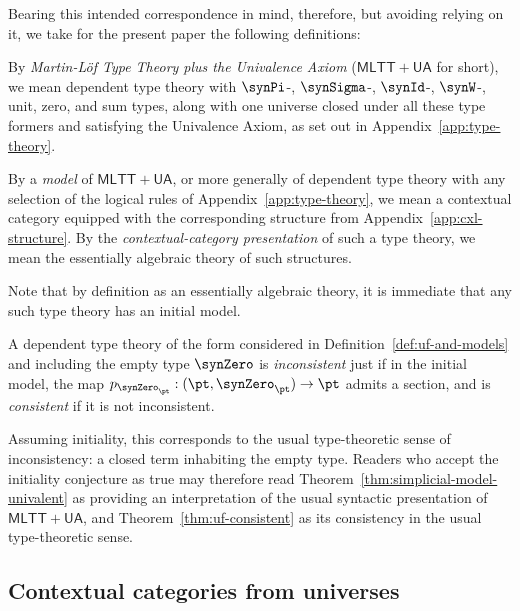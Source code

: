 Bearing this intended correspondence in mind, therefore, but avoiding relying on it, we take for the present paper the following definitions:

\begin{definition} \label{def:uf-and-models}
  By \emph{Martin-L\"of Type Theory plus the Univalence Axiom} ($\mathsf{MLTT}+\mathsf{UA}$ for short), we mean dependent type theory with $\synPi$-, $\synSigma$-, $\synId$-, $\synW$-, unit, zero, and sum types, along with one universe closed under all these type formers and satisfying the Univalence Axiom, as set out in Appendix~\ref{app:type-theory}.

  By a \emph{model} of $\mathsf{MLTT}+\mathsf{UA}$, or more generally of dependent type theory with any selection of the logical rules of Appendix~\ref{app:type-theory}, we mean a contextual category equipped with the corresponding structure from Appendix~\ref{app:cxl-structure}.  By the \emph{contextual-category presentation} of such a type theory, we mean the essentially algebraic theory of such structures.
\end{definition}

Note that by definition as an essentially algebraic theory, it is immediate that any such type theory has an initial model.

\begin{definition}
  A dependent type theory of the form considered in Definition~\ref{def:uf-and-models} and including the empty type $\synZero$ is \emph{inconsistent} just if in the initial model, the map $p_{\synZero_\pt} : (\pt,\synZero_\pt) \to \pt$ admits a section, and is \emph{consistent} if it is not inconsistent.
\end{definition}

Assuming initiality, this corresponds to the usual type-theoretic sense of inconsistency: a closed term inhabiting the empty type.
Readers who accept the initiality conjecture as true may therefore read Theorem~\ref{thm:simplicial-model-univalent} as providing an interpretation of the usual syntactic presentation of $\mathsf{MLTT}+\mathsf{UA}$, and Theorem~\ref{thm:uf-consistent} as its consistency in the usual type-theoretic sense.

\subsection{Contextual categories from universes} \label{subsec:contextualization}

